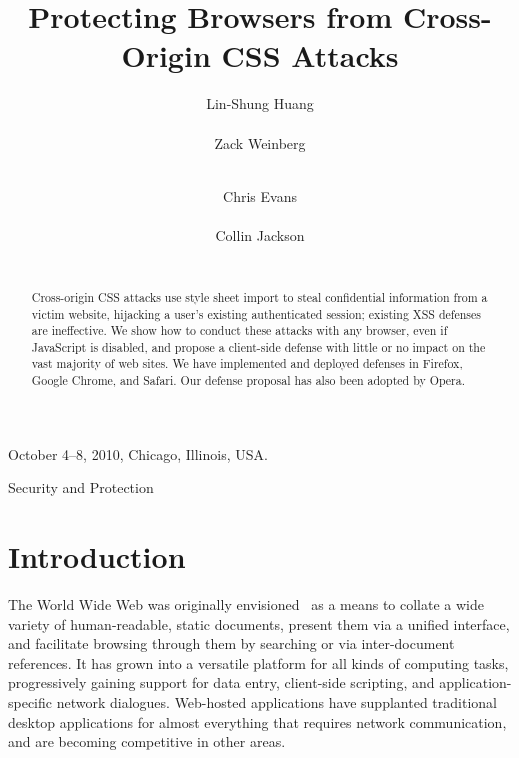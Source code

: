 \documentclass{sig-alternate}
\begin{document}
 {October 4--8, 2010, Chicago, Illinois, USA.}

\title{Protecting Browsers from Cross-Origin CSS Attacks}
\author{
\alignauthor
Lin-Shung Huang\\
      \\
\alignauthor
Zack Weinberg\\
      \\
\and
\alignauthor
Chris Evans\\
      \\
\alignauthor
Collin Jackson\\
      \\
}

\newcommand{\todo}[1]{\textbf{[TODO: #1]}}

\maketitle
\begin{abstract}
Cross-origin CSS attacks use style sheet import to steal confidential
information from a victim website, hijacking a user's existing
authenticated session; existing XSS defenses are ineffective.  We show
how to conduct these attacks with any browser, even if JavaScript is
disabled, and propose a client-side defense with little or no impact
on the vast majority of web sites. We have implemented and deployed
defenses in Firefox, Google Chrome, and Safari. Our defense proposal
has also been adopted by Opera.
\end{abstract}

                {Security and Protection}



\section{Introduction}\label{sec:intro}

The World Wide Web was originally envisioned~\cite{wwwproposal} as a
means to collate a wide variety of human-readable, static documents,
present them via a unified interface, and facilitate browsing through
them by searching or via inter-document references. It has grown into
a versatile platform for all kinds of computing tasks, progressively
gaining support for data entry, client-side scripting, and
application-specific network dialogues.  Web-hosted applications have
supplanted traditional desktop applications for almost everything that
requires network communication, and are becoming competitive in other
areas.
\end{document}
